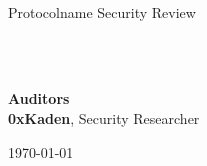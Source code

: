 \begin{titlepage}
  \vbox{}
  \vbox{}

  \begin{center}


    \noindent\makebox[\linewidth]{\rule{.7\paperwidth}{.6pt}}\\[0.7cm]

    { \huge \bfseries

      Protocolname Security Review
    }\\[0.25cm]
    
    \noindent\makebox[\linewidth]{\rule{.7\paperwidth}{.6pt}}\\[0.7cm]

    
    \vfill
    
    \large
    {\bfseries Auditors}\\
    
    {\bfseries0xKaden}, Security Researcher \\

    \vspace{5cm}

    {\large \today}

  \end{center}

\end{titlepage}